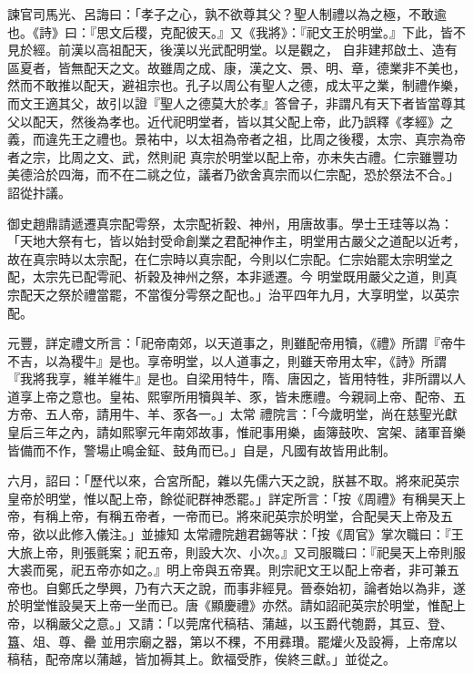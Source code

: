 \begin{pinyinscope}
 諫官司馬光、呂誨曰：「孝子之心，孰不欲尊其父？聖人制禮以為之極，不敢逾也。《詩》曰：『思文后稷，克配彼天。』又《我將》：『祀文王於明堂。』下此，皆不見於經。前漢以高祖配天，後漢以光武配明堂。以是觀之，
 自非建邦啟土、造有區夏者，皆無配天之文。故雖周之成、康，漢之文、景、明、章，德業非不美也，然而不敢推以配天，避祖宗也。孔子以周公有聖人之德，成太平之業，制禮作樂，而文王適其父，故引以證『聖人之德莫大於孝』答曾子，非謂凡有天下者皆當尊其父以配天，然後為孝也。近代祀明堂者，皆以其父配上帝，此乃誤釋《孝經》之義，而違先王之禮也。景祐中，以太祖為帝者之祖，比周之後稷，太宗、真宗為帝者之宗，比周之文、武，然則祀
 真宗於明堂以配上帝，亦未失古禮。仁宗雖豐功美德洽於四海，而不在二祧之位，議者乃欲舍真宗而以仁宗配，恐於祭法不合。」詔從抃議。



 御史趙鼎請遞遷真宗配雩祭，太宗配祈穀、神州，用唐故事。學士王珪等以為：「天地大祭有七，皆以始封受命創業之君配神作主，明堂用古嚴父之道配以近考，故在真宗時以太宗配，在仁宗時以真宗配，今則以仁宗配。仁宗始罷太宗明堂之配，太宗先已配雩祀、祈穀及神州之祭，本非遞遷。今
 明堂既用嚴父之道，則真宗配天之祭於禮當罷，不當復分雩祭之配也。」治平四年九月，大享明堂，以英宗配。



 元豐，詳定禮文所言：「祀帝南郊，以天道事之，則雖配帝用犢，《禮》所謂『帝牛不吉，以為稷牛』是也。享帝明堂，以人道事之，則雖天帝用太牢，《詩》所謂『我將我享，維羊維牛』是也。自梁用特牛，隋、唐因之，皆用特牲，非所謂以人道享上帝之意也。皇祐、熙寧所用犢與羊、豕，皆未應禮。今親祠上帝、配帝、五方帝、五人帝，請用牛、羊、豕各一。」太常
 禮院言：「今歲明堂，尚在慈聖光獻皇后三年之內，請如熙寧元年南郊故事，惟祀事用樂，鹵簿鼓吹、宮架、諸軍音樂皆備而不作，警場止鳴金鉦、鼓角而已。」自是，凡國有故皆用此制。



 六月，詔曰：「歷代以來，合宮所配，雜以先儒六天之說，朕甚不取。將來祀英宗皇帝於明堂，惟以配上帝，餘從祀群神悉罷。」詳定所言：「按《周禮》有稱昊天上帝，有稱上帝，有稱五帝者，一帝而已。將來祀英宗於明堂，合配昊天上帝及五帝，欲以此修入儀注。」並據知
 太常禮院趙君錫等狀：「按《周官》掌次職曰：『王大旅上帝，則張氈案；祀五帝，則設大次、小次。』又司服職曰：『祀昊天上帝則服大裘而冕，祀五帝亦如之。』明上帝與五帝異。則宗祀文王以配上帝者，非可兼五帝也。自鄭氏之學興，乃有六天之說，而事非經見。晉泰始初，論者始以為非，遂於明堂惟設昊天上帝一坐而已。唐《顯慶禮》亦然。請如詔祀英宗於明堂，惟配上帝，以稱嚴父之意。」又請：「以莞席代稿秸、蒲越，以玉爵代匏爵，其豆、登、簋、俎、尊、罍
 並用宗廟之器，第以不稞，不用彞瓚。罷爟火及設褥，上帝席以稿秸，配帝席以蒲越，皆加褥其上。飲福受胙，俟終三獻。」並從之。




\end{pinyinscope}
